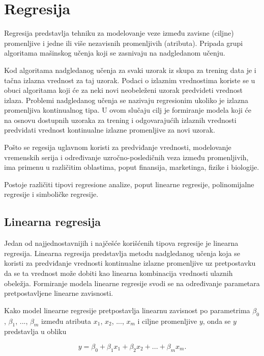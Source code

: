 \documentclass[main.tex]{subfiles}
\begin{document}
\section{Regresija}
\label{sec:regresija}

Regresija predstavlja tehniku za modelovanje veze između zavisne (ciljne) promenljive i jedne ili više nezavisnih promenljivih (atributa). Pripada grupi algoritama mašinskog učenja koji se zasnivaju na nadgledanom učenju. 

Kod algoritama nadgledanog učenja za svaki uzorak iz skupa za trening data je i tačna izlazna vrednost za taj uzorak. Podaci o izlaznim vrednostima koriste se u obuci algoritama koji će za neki novi neobeleženi uzorak predvideti vrednost izlaza. Problemi nadgledanog učenja se nazivaju regresionim ukoliko je izlazna promenljiva kontinualnog tipa. U ovom slučaju cilj je formiranje modela koji će na osnovu dostupnih uzoraka za trening i odgovarajućih izlaznih vrednosti predvidati vrednost kontinualne izlazne promenljive za novi uzorak.

Pošto se regesija uglavnom koristi za predviđanje vrednosti, modelovanje vremenskih serija i određivanje uzročno-posledičnih veza između promenljivih, ima primenu u različitim oblastima, poput finansija, marketinga, fizike i biologije.

Postoje različiti tipovi regresione analize, poput linearne regresije, polinomijalne regresije i simboličke regresije.


\subsection{Linearna regresija}
\label{sec:linearnaRegresija}

Jedan od najjednostavnijih i najčešće korišćenih tipova regresije je linearna regresija. Linearna regresija predstavlja metodu nadgledanog učenja koja se koristi za predviđanje vrednosti kontinualne izlazne promenljive uz pretpostavku da se ta vrednost može dobiti kao linearna kombinacija vrednosti ulaznih obeležja. Formiranje modela linearne regresije svodi se na određivanje parametara pretpostavljene linearne zavisnosti.

Kako model linearne regresije pretpostavlja linearnu zavisnost po parametrima $\beta_0$, $\beta_1$, ..., $\beta_m$ između atributa $x_1$, $x_2$, ..., $x_m$ i ciljne promenljive $y$, onda se $y$ predstavlja u obliku

\[ y = \beta_0 + \beta_1 x_1 + \beta_2 x_2 + ... + \beta_m x_m .\]
\end{document}
